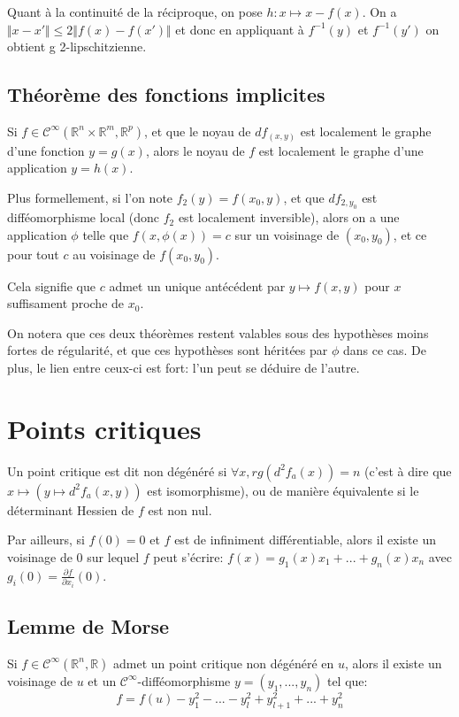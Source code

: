 \documentclass{article}
\begin{document}
Quant à la continuité de la réciproque, on pose $h:x\mapsto x-f(x)$. On a $\Vert x-x' \Vert\leq 2\Vert f(x) - f(x')\Vert$ et donc en appliquant à $f^{-1}(y)$ et $f^{-1}(y')$ on obtient g 2-lipschitzienne.

\subsection{Théorème des fonctions implicites}

Si $f\in\mathcal{C}^{\infty}(\mathbb{R}^n\times\mathbb{R}^m,\mathbb{R}^p)$, et que le noyau de $df_{(x,y)}$ est localement le graphe d'une fonction $y=g(x)$, alors le noyau de $f$ est localement le graphe d'une application $y=h(x)$.

Plus formellement, si l'on note $f_2(y) = f(x_0, y)$, et que $df_{2,y_0}$ est difféomorphisme local (donc $f_2$ est localement inversible), alors on a une application $\phi$ telle que $f(x,\phi(x))=c$ sur un voisinage de $(x_0,y_0)$, et ce pour tout $c$ au voisinage de $f(x_0,y_0)$.

Cela signifie que $c$ admet un unique antécédent par $y\mapsto f(x,y)$ pour $x$ suffisament proche de $x_0$.

\bigskip

On notera que ces deux théorèmes restent valables sous des hypothèses moins fortes de régularité, et que ces hypothèses sont héritées par $\phi$ dans ce cas. De plus, le lien entre ceux-ci est fort: l'un peut se déduire de l'autre.

\section{Points critiques}

Un point critique est dit non dégénéré si $\forall x, rg(d^2f_a(x))=n$ (c'est à dire que $x\mapsto(y\mapsto d^2f_a(x,y))$ est isomorphisme), ou de manière équivalente si le déterminant Hessien de $f$ est non nul.

Par ailleurs, si $f(0)=0$ et $f$ est de infiniment différentiable, alors il existe un voisinage de 0 sur lequel $f$ peut s'écrire: $f(x)=g_1(x)x_1+...+g_n(x)x_n$ avec $g_i(0) = \frac{\partial f}{\partial x_i}(0)$.

\subsection{Lemme de Morse}

Si $f\in\mathcal{C}^\infty(\mathbb{R}^n,\mathbb{R})$ admet un point critique non dégénéré en $u$, alors il existe un voisinage de $u$ et un $\mathcal{C}^\infty$-difféomorphisme $y=(y_1,...,y_n)$ tel que: $$f=f(u)-y_1^2-...-y_l^2+y_{l+1}^2+...+y_n^2$$
\end{document}
